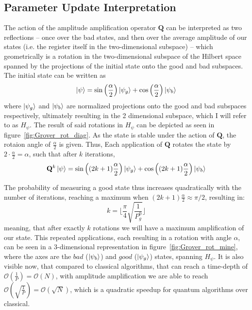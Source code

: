 \documentclass[encoding=utf8,british]{tumphthesis}
\begin{document}
        \subsection{Parameter Update Interpretation}
        \label{subsect:QSA_AA_paramupdate}

        The action of the amplitude amplification operator $\mathbf{Q}$ can be interpreted as two reflections -- once over the bad states, 
        and then over the average amplitude of our states (i.e. the register itself in the two-dimensional subspace) -- which geometrically is a rotation in the 
        two-dimensional subspace of the Hilbert space spanned by the projections of the initial state onto the good and bad subspaces. The initial state can be 
        written as
        \begin{equation*}
        \left|\psi\right> = \sin \left( \frac{\alpha}{2} \right)\left|\psi_g\right> + \cos \left( \frac{\alpha}{2} \right)\left|\psi_b\right>
        \end{equation*}
        where $\left|\psi_g\right>$ and $\left|\psi_b\right>$ are normalized projections onto the good and bad subspaces respectively, ultimately resulting in
        the 2 dimensional subspace, which I will refer to as $H_{\psi}$. 
        The result of said rotations in $H_{\psi}$ can be depicted as seen in figure~\ref{fig:Grover_rot_diag}.
        As the state is stable under the action of $\mathbf{Q}$, the rotaion angle of $\frac{\alpha}{2}$ is given. Thus, 
        Each application of $\mathbf{Q}$ rotates the state by $2\cdot \frac{\alpha}{2} = \alpha$, such that after $k$ iterations,
        \begin{equation*}
        \mathbf{Q}^k \left|\psi\right> = \sin\left((2k+1)\frac{\alpha}{2} \right)\left|\psi_g\right> + \cos\left((2k+1)\frac{\alpha}{2} \right)\left|\psi_b\right>
        \end{equation*}
        
        The probability of measuring a good state thus increases quadratically with the number of iterations, reaching a maximum when $(2k+1)\frac{\alpha}{2} \approx \pi/2$,
        resulting in:
        \begin{equation}
            k = \lfloor \frac{\pi}{4}\sqrt{\frac{1}{P_g^0}} \rfloor
        \label{eq:needed_k}
        \end{equation}
        meaning, that after exactly $k$ rotations we will have a maximum amplification of our state. This repeated applications, each resulting in 
        a rotation with angle $\alpha$, can be seen in a 3-dimensional representation in figure~\ref{fig:Grover_rot_mine}, where the axes are the $bad$ ($\left|\psi_b\right>$)
        and $good$ ($\left|\psi_g\right>$) states, spanning $H_{\psi}$. It is also visible now, that compared to classical algorithms, that can reach a time-depth of 
        $\mathcal{O}(\frac{1}{P}) = \mathcal{O}(N)$, with amplitude amplification we are able to reach $\mathcal{O}(\sqrt{\frac{1}{P}}) = \mathcal{O}(\sqrt{N})$, which is a 
        quadratic speedup for quantum algorithms over classical.  
\end{document}
